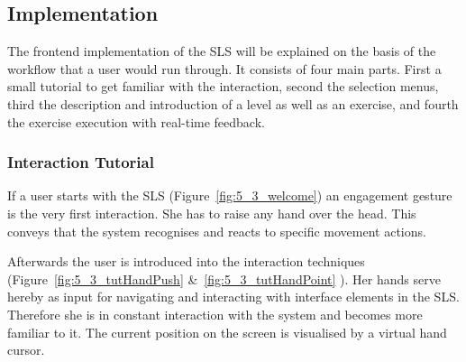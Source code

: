 

\subsection{Implementation}
The frontend implementation of the SLS will be explained on the basis of the workflow that a user would run through. It consists of four main parts. First a small tutorial to get familiar with the interaction,  second the selection menus, third the description and introduction of a level as well as an exercise, and fourth the exercise execution with real-time feedback. 

\subsubsection{Interaction Tutorial}
If a user starts with the SLS (Figure~\ref{fig:5_3_welcome}) an engagement gesture is the very first interaction. She has to raise any hand over the head. This conveys that the system recognises and reacts to specific movement actions. 

Afterwards the user is introduced into the interaction techniques (Figure~\ref{fig:5_3_tutHandPush} \&~\ref{fig:5_3_tutHandPoint} ).
Her hands serve hereby as input for navigating and interacting with interface elements in the SLS. Therefore she is in constant interaction with the system and becomes more familiar to it.
The current position on the screen is visualised by a virtual hand cursor.

